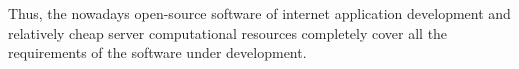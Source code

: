 \documentclass[conference]{IEEEtran}
\begin{document}
Thus, the nowadays open-source software of internet application
development and relatively cheap server computational resources
completely cover all the requirements of the software under
development.






%
%



%
%
\end{document}
